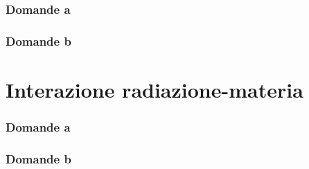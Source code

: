 \documentclass[10pt,a4paper]{article}
\begin{document}
\section{Domande a}
\section{Domande b}



\part{Interazione radiazione-materia}
\setcounter{section}{0}
\renewcommand*{\theHsection}{chX.\the\value{section}}

\section{Domande a}

\section{Domande b}
\end{document}
